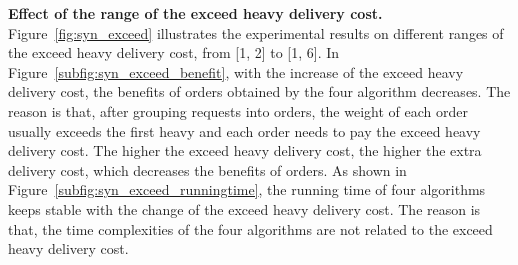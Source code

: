 \textbf{Effect of the range of the exceed heavy delivery cost.}  Figure~\ref{fig:syn_exceed} illustrates the experimental results on different ranges of the exceed heavy delivery cost, from [1, 2] to [1, 6]. In Figure~\ref{subfig:syn_exceed_benefit}, with the increase of the exceed heavy delivery cost, the benefits of orders obtained by the four algorithm decreases. The reason is that, after grouping requests into orders, the weight of each order usually exceeds the first heavy and each order needs to pay the exceed heavy delivery cost. The higher the exceed heavy delivery cost, the higher the extra delivery cost, which decreases the benefits of orders. As shown in Figure~\ref{subfig:syn_exceed_runningtime}, the running time of four algorithms keeps stable with the change of the exceed heavy delivery cost. The reason is that, the time complexities of the four algorithms are not related to the exceed heavy delivery cost.














